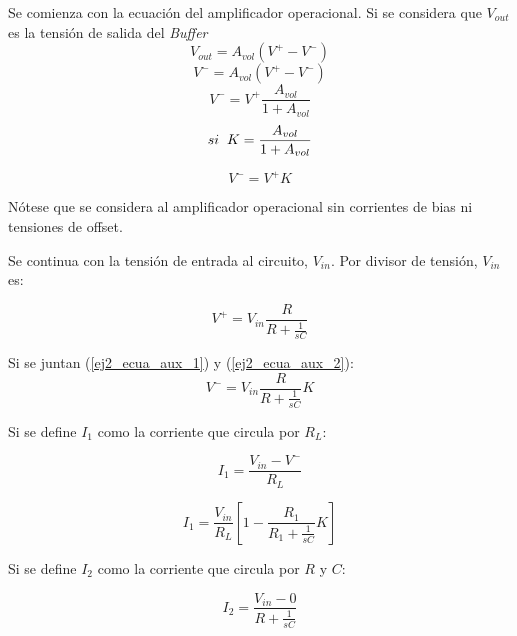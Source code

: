 Se comienza con la ecuación del amplificador operacional. Si se considera que $V_{out}$ es la tensión de salida del \textit{Buffer}
\begin{displaymath} V_{out} = A_{vol} (V^+ - V^-) \end{displaymath}
\begin{displaymath} V^- = A_{vol} (V^+ - V^-) \end{displaymath}
\begin{displaymath} V^- = V^+\frac{A_{vol}}{1+A_{vol}} \end{displaymath}  
\begin{displaymath}  si \hspace{2mm} K = \frac{A_{vol}}{1+A_{vol}} \end{displaymath} 

\begin{equation} V^- = V^+K \label{ej2_ecua_aux_1}\end{equation}


Nótese que se considera al amplificador operacional sin corrientes de bias ni tensiones de offset.

Se continua con la tensión de entrada al circuito, $V_{in}$. Por divisor de tensión, $V_{in}$ es:

\begin{equation} V^+ = V_{in} \frac{R}{R+\frac{1}{sC}} \label{ej2_ecua_aux_2}\end{equation}

Si se juntan (\ref{ej2_ecua_aux_1}) y (\ref{ej2_ecua_aux_2}):
\begin{displaymath} V^- = V_{in} \frac{R}{R+\frac{1}{sC}} K \end{displaymath}

Si se define $I_1$ como la corriente que circula por $R_L$:

\begin{displaymath} I_1 = \frac{V_{in} - V^-}{R_L} \end{displaymath}

\begin{displaymath} I_1 = \frac{V_{in}}{R_L}[1-\frac{R_1}{R_1 + \frac{1}{sC}}K] \end{displaymath}

Si se define $I_2$ como la corriente que circula por $R$ y $C$:    

\begin{displaymath} I_2 = \frac{V_{in} - 0}{R + \frac{1}{sC}} \end{displaymath}

